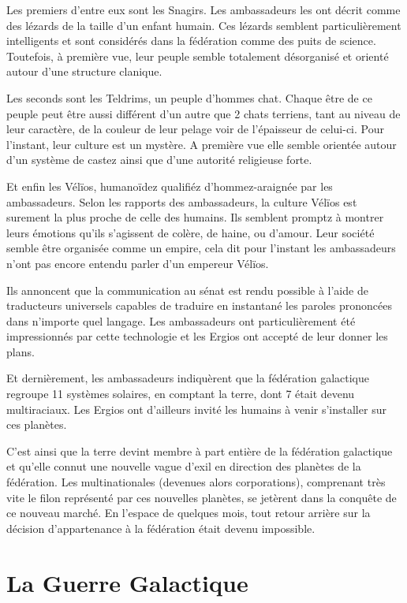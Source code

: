 \begin{multicols}{2}
Les premiers d’entre eux sont les Snagirs. Les ambassadeurs les ont décrit comme des lézards de la taille d’un enfant humain. Ces lézards semblent particulièrement intelligents et sont considérés dans la fédération comme des puits de science. Toutefois, à première vue, leur peuple semble totalement désorganisé et orienté autour d’une structure clanique.

Les seconds sont les Teldrims, un peuple d’hommes chat. Chaque être de ce peuple peut être aussi différent d'un autre  que 2 chats terriens, tant au niveau de leur caractère, de la couleur de leur pelage voir de l’épaisseur de celui-ci. Pour l’instant, leur culture est un mystère. A première vue elle semble orientée autour d’un système de castez ainsi que d’une autorité religieuse forte. 

Et enfin les Vélïos, humanoïdez qualifiéz d’hommez-araignée par les ambassadeurs. Selon les rapports des ambassadeurs, la culture Vélïos est surement la plus proche de celle des humains. Ils semblent promptz à montrer leurs émotions qu’ils s’agissent de colère, de haine, ou d’amour. Leur société semble être organisée comme un empire, cela dit pour l’instant les ambassadeurs n’ont pas encore entendu parler d’un empereur Vélïos.

Ils annoncent que la communication au sénat est rendu possible à l’aide de traducteurs universels capables de traduire en instantané les paroles prononcées dans n’importe quel langage. Les ambassadeurs ont particulièrement été impressionnés par cette technologie et les Ergios ont accepté de leur donner les plans.

Et dernièrement, les ambassadeurs indiquèrent que la fédération galactique regroupe 11 systèmes solaires, en comptant la terre, dont 7 était devenu multiraciaux. Les Ergios ont d’ailleurs invité les humains à venir s’installer sur ces planètes.

C’est ainsi que la terre devint membre à part entière de la fédération galactique et qu’elle connut une nouvelle vague d’exil en direction des planètes de la fédération. Les multinationales (devenues alors corporations), comprenant très vite le filon représenté par ces nouvelles planètes, se jetèrent dans la conquête de ce nouveau marché. En l’espace de quelques mois, tout retour arrière sur la décision d’appartenance à la fédération était devenu impossible.

\section{La Guerre Galactique}


\end{multicols}
